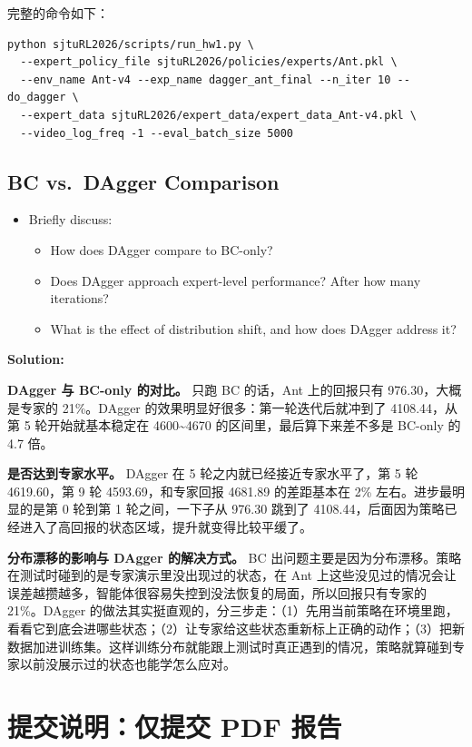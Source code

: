 \documentclass{article}
\begin{document}
完整的命令如下：
\begin{lstlisting}
python sjtuRL2026/scripts/run_hw1.py \
  --expert_policy_file sjtuRL2026/policies/experts/Ant.pkl \
  --env_name Ant-v4 --exp_name dagger_ant_final --n_iter 10 --do_dagger \
  --expert_data sjtuRL2026/expert_data/expert_data_Ant-v4.pkl \
  --video_log_freq -1 --eval_batch_size 5000
\end{lstlisting}

\subsection{BC vs.\ DAgger Comparison}
\begin{itemize}
    \item Briefly discuss:
    \begin{itemize}
        \item How does DAgger compare to BC-only?
        \item Does DAgger approach expert-level performance? After how many iterations?
        \item What is the effect of distribution shift, and how does DAgger address it?
    \end{itemize}
\end{itemize}

\textbf{Solution:}

\textbf{DAgger 与 BC-only 的对比。} 只跑 BC 的话，Ant 上的回报只有 976.30，大概是专家的 21\%。DAgger 的效果明显好很多：第一轮迭代后就冲到了 4108.44，从第 5 轮开始就基本稳定在 4600\textasciitilde 4670 的区间里，最后算下来差不多是 BC-only 的 4.7 倍。

\textbf{是否达到专家水平。} DAgger 在 5 轮之内就已经接近专家水平了，第 5 轮 4619.60，第 9 轮 4593.69，和专家回报 4681.89 的差距基本在 2\% 左右。进步最明显的是第 0 轮到第 1 轮之间，一下子从 976.30 跳到了 4108.44，后面因为策略已经进入了高回报的状态区域，提升就变得比较平缓了。

\textbf{分布漂移的影响与 DAgger 的解决方式。} BC 出问题主要是因为分布漂移。策略在测试时碰到的是专家演示里没出现过的状态，在 Ant 上这些没见过的情况会让误差越攒越多，智能体很容易失控到没法恢复的局面，所以回报只有专家的 21\%。DAgger 的做法其实挺直观的，分三步走：（1）先用当前策略在环境里跑，看看它到底会进哪些状态；（2）让专家给这些状态重新标上正确的动作；（3）把新数据加进训练集。这样训练分布就能跟上测试时真正遇到的情况，策略就算碰到专家以前没展示过的状态也能学怎么应对。

\newpage
\section{提交说明：仅提交 PDF 报告}
\end{document}
